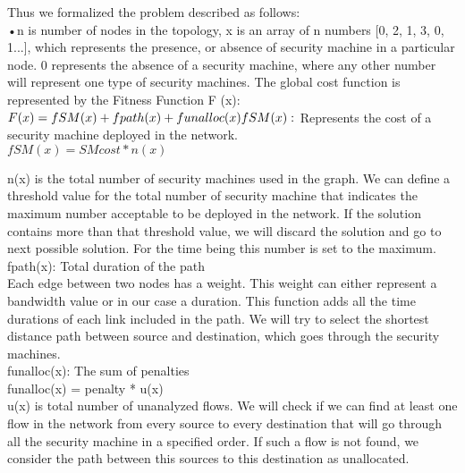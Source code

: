 \documentclass{article}
\begin{document}
 Thus we formalized the problem  described as follows:\\
 •n is number of nodes in the topology, x is an array of n numbers [0, 2, 1, 3, 0, 1...], which represents the presence, or absence of security machine in a particular node. 0 represents the absence of a security machine, where any other number will represent one type of security machines. The global cost function is represented by the Fitness Function F (x):\\ \newline
$ F(x) = fSM (x) + fpath(x) + funalloc(x) \\
 fSM (x):$ Represents the cost of a security machine deployed in the network.\\
 $fSM (x) = SMcost * n(x) $\\ \newline
 
 n(x) is the total number of security machines used in the graph. We can define a threshold value for the total number of security machine that indicates the maximum number acceptable to be deployed in the network. If the solution contains more than that threshold value, we will discard the solution and go to next possible solution. For the time being this number is set to the maximum.\\
 fpath(x): Total duration of the path\\
 Each edge between two nodes has a weight. This weight can either represent a bandwidth value or in our case a duration. This function adds all the time durations of each link included in the path. We will try to select the shortest distance path between source and destination, which goes through the security machines.\\
 funalloc(x): The sum of penalties\\
 funalloc(x) = penalty * u(x)\\
 u(x) is total number of unanalyzed flows. We will check if we can find at least one flow in the network from every source to every destination that will go through all the security machine in a specified order. If such a flow is not found, we consider the path between this sources to this destination as unallocated. 
\end{document}
